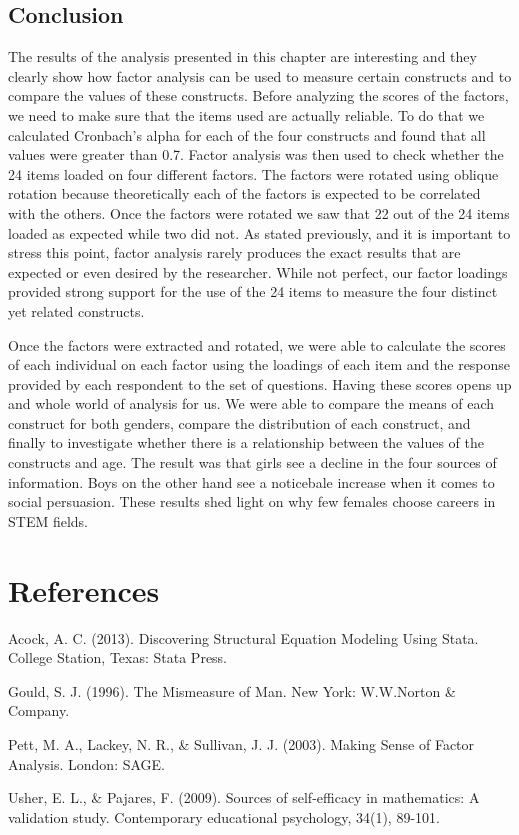 \documentclass[a4paper,12pt,oneside]{book}
\begin{document}
\section{Conclusion}
The results of the analysis presented in this chapter are interesting and they clearly show how factor analysis can be used to measure certain 
constructs and to compare the values of these constructs. Before analyzing the scores of the factors, we need to make sure that the items used are
actually reliable. To do that we calculated Cronbach's alpha for each of the four constructs and found that all values were greater than 0.7. Factor
analysis was then used to check whether the 24 items loaded on four different factors. The factors were rotated using oblique rotation because
theoretically each of the factors is expected to be correlated with the others. Once the factors were rotated we saw that 22 out of the 24 items
loaded as expected while two did not. As stated previously, and it is important to stress this point, factor analysis rarely produces the exact
results that are expected or even desired by the researcher. While not perfect, our factor loadings provided strong support for the use of the
24 items to measure the four distinct yet related constructs. 

Once the factors were extracted and rotated, we were able to calculate the scores of each individual on each factor using the loadings of 
each item and the response provided by each respondent to the set of questions. Having these scores opens up and whole world of analysis for us.
We were able to compare the means of each construct for both genders, compare the distribution of each construct, and finally to investigate
whether there is a relationship between the values of the constructs and age. The result was that girls see a decline in the four sources of 
information. Boys on the other hand see a noticebale increase when it comes to social persuasion. These results shed light on why few females
choose careers in STEM fields.
   
\chapter{References}

Acock, A. C. (2013). Discovering Structural Equation Modeling Using Stata. College Station, Texas: Stata Press.

Gould, S. J. (1996). The Mismeasure of Man. New York: W.W.Norton \& Company.

Pett, M. A., Lackey, N. R., \& Sullivan, J. J. (2003). Making Sense of Factor Analysis. London: SAGE.

Usher, E. L., \& Pajares, F. (2009). Sources of self-efficacy in mathematics: A validation study. Contemporary educational psychology, 34(1), 89-101.
\end{document}

